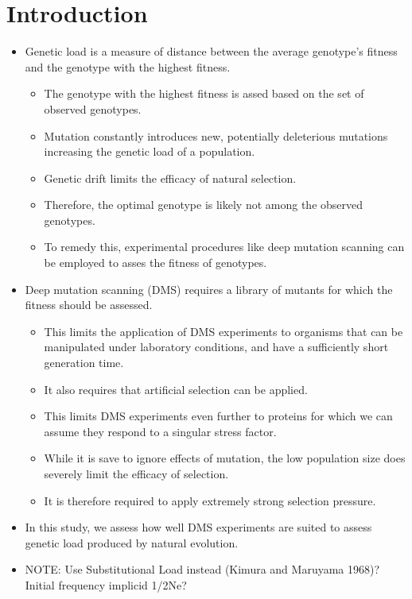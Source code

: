 \documentclass[12pt]{article}
\begin{document}
\section*{Introduction}
\begin{itemize}
	\item Genetic load is a measure of distance between the average genotype's fitness and the genotype with the highest fitness.
	\begin{itemize}
		\item The genotype with the highest fitness is assed based on the set of observed genotypes.
		\item Mutation constantly introduces new, potentially deleterious mutations increasing the genetic load of a population.
		\item Genetic drift limits the efficacy of natural selection.
		\item Therefore, the optimal genotype is likely not among the observed genotypes.
		\item To remedy this, experimental procedures like deep mutation scanning can be employed to asses the fitness of genotypes.
	\end{itemize}
	\item Deep mutation scanning (DMS) requires a library of mutants for which the fitness should be assessed.
	\begin{itemize}
		\item This limits the application of DMS experiments to organisms that can be manipulated under laboratory conditions, and have a sufficiently short generation time.
		\item It also requires that artificial selection can be applied.
		\item This limits DMS experiments even further to proteins for which we can assume they respond to a singular stress factor.
		\item While it is save to ignore effects of mutation, the low population size does severely limit the efficacy of selection.
		\item It is therefore required to apply extremely strong selection pressure.
	\end{itemize}
	\item In this study, we assess how well DMS experiments are suited to assess genetic load produced by natural evolution.
	\item NOTE: Use Substitutional Load instead (Kimura and Maruyama 1968)? Initial frequency implicid 1/2Ne?
	\begin{itemize}

\end{itemize}
\end{itemize}
\end{document}
